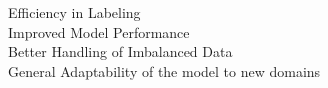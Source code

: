 \documentclass[preview]{standalone}
\begin{document}
Efficiency in Labeling\\Improved Model Performance\\Better Handling of Imbalanced Data\\General Adaptability of the model to new domains\\
\end{document}
